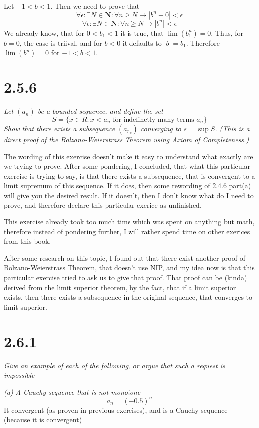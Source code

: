 \documentclass[11pt,oneside,titlepage]{article}
\begin{document}
Let $-1 < b < 1$. Then we need to prove that
$$\forall \epsilon: \exists N \in \textbf{N}: \forall n \geq N \to
|b^n - 0| < \epsilon$$
$$\forall \epsilon: \exists N \in \textbf{N}: \forall n \geq N \to
|b^n| < \epsilon$$
We already know, that for $0 < b_1 < 1$ it is true, that $\lim (b_1^n) = 0$.
Thus, for $b = 0$, the case is triival, and for $b < 0$ it defaults to
$|b| = b_1$. Therefore $\lim (b^n) = 0$ for $-1 < b < 1$.

\section*{2.5.6}
\textit{Let $(a_n)$ be a bounded sequence, and define the set }
$$S = \{x \in R: x < a_n \text{ for indefinetly many terms }a_n \}$$
\textit{Show that there exists a subsequence $(a_{n_k})$ converging to
  $s = \sup S$. (This is a direct proof of the Bolzano-Weierstrass Theorem
  using Axiom of Completeness.) }

The wording of this exercise doesn't make it easy to understand what exactly
are we trying to prove. After some pondering, I concluded, that what this
particular exercise is trying to say, is that there exists a subsequence,
that is convergent to a limit supremum of this sequence. If it does, then
some rewording of 2.4.6 part(a) will give you the desired result. If it
doesn't, then I don't know what do I need to prove, and therefore
declare this particular exerice as unfinished.

This exercise already took too much time which was spent on anything but
math, therefore instead of pondering further, I will rather spend time on
other exerices from this book.

After some research on this topic, I found out that there exist another
proof of Bolzano-Weierstrass Theorem, that doesn't use NIP, and my idea
now is that this particular exercise tried to ask us to give that proof.
That proof can be (kinda) derived from the limit superior theorem, by
the fact, that if a limit superior exists, then there exists 
a subsequence in the original sequence, that converges to limit
superior.

\section*{2.6.1}
\textit{Give an example of each of the following, or argue that such a request
  is impossible }

\textit{(a) A Cauchy sequence that is not monotone}
$$a_n = (-0.5)^n$$
It convergent (as proven in previous exercises), and is a Cauchy sequence
(because it is convergent)
\end{document}
